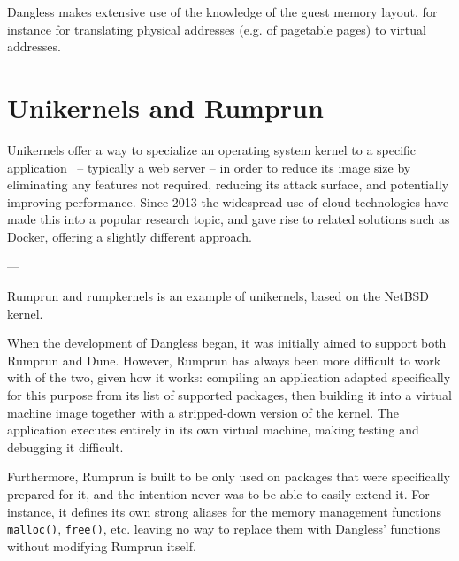 Dangless makes extensive use of the knowledge of the guest memory layout, for instance for translating physical addresses (e.g. of pagetable pages) to virtual addresses.



\section{Unikernels and Rumprun}

Unikernels offer a way to specialize an operating system kernel to a specific application~\cite{unikernels-intro} -- typically a web server -- in order to reduce its image size by eliminating any features not required, reducing its attack surface, and potentially improving performance. Since 2013 the widespread use of cloud technologies have made this into a popular research topic, and gave rise to related solutions such as Docker, offering a slightly different approach. 

---

Rumprun and rumpkernels is an example of unikernels, based on the NetBSD kernel.

When the development of Dangless began, it was initially aimed to support both Rumprun and Dune. However, Rumprun has always been more difficult to work with of the two, given how it works: compiling an application adapted specifically for this purpose from its list of supported packages, then building it into a virtual machine image together with a stripped-down version of the kernel. The application executes entirely in its own virtual machine, making testing and debugging it difficult.

Furthermore, Rumprun is built to be only used on packages that were specifically prepared for it, and the intention never was to be able to easily extend it. For instance, it defines its own strong aliases for the memory management functions \lstinline!malloc()!, \lstinline!free()!, etc. leaving no way to replace them with Dangless' functions without modifying Rumprun itself.

